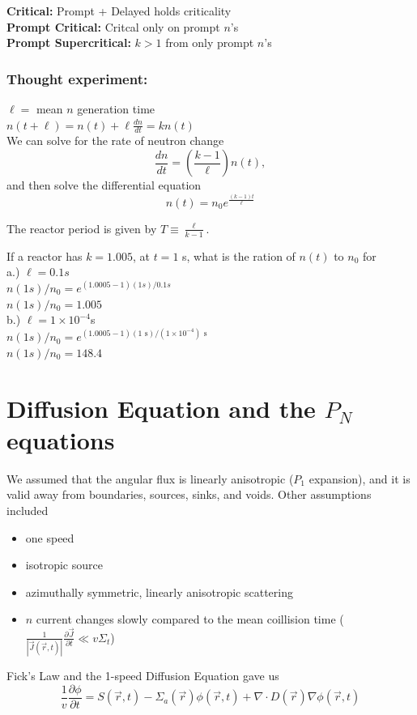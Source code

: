 \documentclass{report}
\newcommand{\tab}{\-\hspace{1cm}}
\newcommand{\h}[1]{\section*{#1}}
\newcommand{\hhh}[1]{\subsubsection*{#1}}
\newcommand{\p}{\partial}
\newcommand{\Xs}{\Sigma}
\newcommand{\Oov}{\frac{1}{v}}
\newcommand{\pos}{\vec{r}}
\newcommand{\cur}{\vec{J}}
\newcommand{\rt}{(\pos,t)}
\begin{document}
\textbf{Critical: } Prompt + Delayed holds criticality\\
\textbf{Prompt Critical:} Critcal only on prompt $n$'s\\
\textbf{Prompt Supercritical: } $k>1$ from only prompt $n$'s\\

\hhh{Thought experiment:}

$\ell =$ mean $n$ generation time\\
$ n(t+\ell) = n(t) + \ell\frac{dn}{dt} = kn(t)$\\

We can solve for the rate of neutron change\\
$$\frac{dn}{dt} = \left(\frac{k-1}{\ell}\right)n(t),$$
and then solve the differential equation
$$n(t) = n_0 e^{\frac{(k-1)t}{\ell}}$$

The reactor period is given by $T \equiv \frac{\ell}{k-1}$.

If a reactor has $k=1.005$, at $t=1$ s, what is the ration of $n(t)$ to $n_0$ for \\
a.) $\ell = 0.1s$\\
\tab $n(1s)/n_0 = e^{(1.0005-1)(1s)/0.1s}$\\
\tab $\boxed{ n(1s)/n_0 = 1.005 }$\\
b.) $\ell = 1 \times 10^{-4}$s\\
\tab $n(1s)/n_0 = e^{(1.0005-1)(1\text{ s})/(1\times10^{-4})\text{ s}}$\\
\tab $\boxed{ n(1s)/n_0 = 148.4 }$
\newpage



\h{Diffusion Equation and the $P_N$ equations}

We assumed that the angular flux is linearly anisotropic ($P_1$ expansion), and it is valid away from boundaries, sources, sinks, and voids. Other assumptions included
\begin{itemize}
    \item one speed
    \item isotropic source
    \item azimuthally symmetric, linearly anisotropic scattering
    \item $n$ current changes slowly compared to the mean coillision time ($\frac{1}{|\cur\rt|} \frac{\p\cur}{\p t} \ll v \Xs_t$)
\end{itemize}

Fick's Law and the 1-speed Diffusion Equation gave us
$$ \Oov \frac{\p \phi}{\p t} = S\rt - \Xs_a(\pos)\phi\rt + \nabla \cdot D(\pos) \nabla\phi\rt $$
\end{document}
